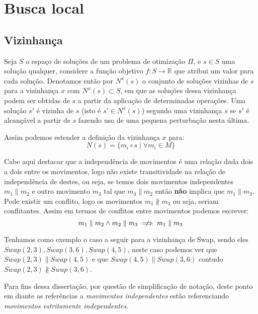 \section{Busca local} \label{sec:buscaLocal}

\subsection{Vizinhança} \label{subsec:vizinhanca}

Seja $S$ o espaço de soluções de um problema de otimização $\Pi$, e $s \in S$ uma solução qualquer, considere a função objetivo $f: S \rightarrow \mathbb{R}$ que atribui um valor para cada solução.
Denotamos então por $N^x(s)$ o conjunto de soluções vizinhas de $s$ para a vizinhança $x$ com $N^x(s) \subset S$, em que as soluções dessa vizinhança podem ser obtidas de $s$ a partir da aplicação de determinadas operações.
Uma solução $s'$ é vizinha de $s$ (isto é $s' \in N^x(s)$) segundo uma vizinhança $s$ se $s'$ é alcançável a partir de $s$ fazendo uso de uma pequena perturbação nesta última.



Assim podemos estender a definição da vizinhança $x$ para:
\begin{equation}  \label{eq:vizinhanca}
N(s) = \{ m_i \circ s \mid \forall m_i \in M \}
\end{equation}

Cabe aqui destacar que a independência de movimentos é uma relação dada dois a dois entre os movimentos, logo não existe transitividade na relação de independência de destes, ou seja, se temos dois movimentos independentes $m_1 \parallel m_2$ e outro movimento $m_3$ tal que $m_3 \parallel m_2$ então \textbf{não} implica que $m_1 \parallel m_3$.
Pode existir um conflito, logo os movimentos $m_1 \nparallel m_3$ ou seja, seriam conflitantes.
Assim em termos de conflitos entre movimentos podemos escrever:
\begin{equation}
m_1 \parallel m_2 \land m_2 \parallel m_3 \centernot\implies m_1 \parallel m_3
\end{equation}

Tenhamos como exemplo o caso a seguir para a vizinhança de Swap, sendo eles $Swap(2,3), Swap(3,6), Swap(4,5)$, neste caso podemos ver que $Swap(2,3) \parallel Swap(4,5)$ e que $Swap(4,5) \parallel Swap(3,6)$ contudo $Swap(2,3) \nparallel Swap(3,6)$.

Para fins dessa dissertação, por questão de simplificação de notação, deste ponto em diante as referências a \textit{movimentos independentes} estão referenciando \textit{movimentos estritamente independentes}.

